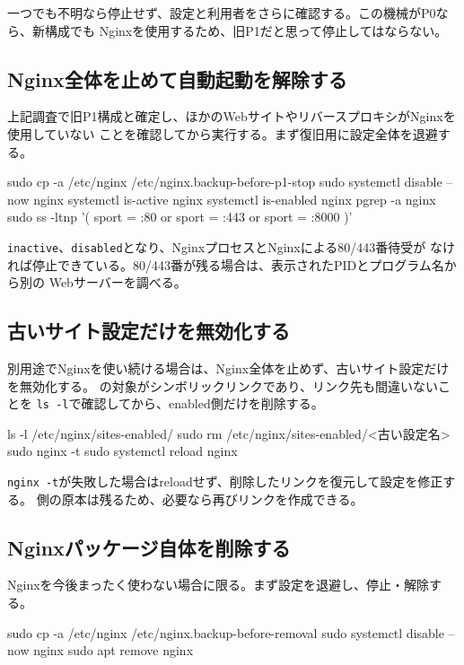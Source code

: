\documentclass[uplatex,a4paper,11pt]{jsarticle}
\begin{document}
一つでも不明なら停止せず、設定と利用者をさらに確認する。この機械がP0なら、新構成でも
Nginxを使用するため、旧P1だと思って停止してはならない。

\subsection{Nginx全体を止めて自動起動を解除する}

上記調査で旧P1構成と確定し、ほかのWebサイトやリバースプロキシがNginxを使用していない
ことを確認してから実行する。まず復旧用に設定全体を退避する。

\begin{command}
sudo cp -a /etc/nginx /etc/nginx.backup-before-p1-stop
sudo systemctl disable --now nginx
systemctl is-active nginx
systemctl is-enabled nginx
pgrep -a nginx
sudo ss -ltnp '( sport = :80 or sport = :443 or sport = :8000 )'
\end{command}

\texttt{inactive}、\texttt{disabled}となり、NginxプロセスとNginxによる80/443番待受が
なければ停止できている。80/443番が残る場合は、表示されたPIDとプログラム名から別の
Webサーバーを調べる。

\subsection{古いサイト設定だけを無効化する}

別用途でNginxを使い続ける場合は、Nginx全体を止めず、古いサイト設定だけを無効化する。
の対象がシンボリックリンクであり、リンク先も間違いないことを
\texttt{ls -l}で確認してから、enabled側だけを削除する。

\begin{command}
ls -l /etc/nginx/sites-enabled/
sudo rm /etc/nginx/sites-enabled/<古い設定名>
sudo nginx -t
sudo systemctl reload nginx
\end{command}

\texttt{nginx -t}が失敗した場合はreloadせず、削除したリンクを復元して設定を修正する。
側の原本は残るため、必要なら再びリンクを作成できる。

\subsection{Nginxパッケージ自体を削除する}

Nginxを今後まったく使わない場合に限る。まず設定を退避し、停止・解除する。

\begin{command}
sudo cp -a /etc/nginx /etc/nginx.backup-before-removal
sudo systemctl disable --now nginx
sudo apt remove nginx
\end{command}
\end{document}
